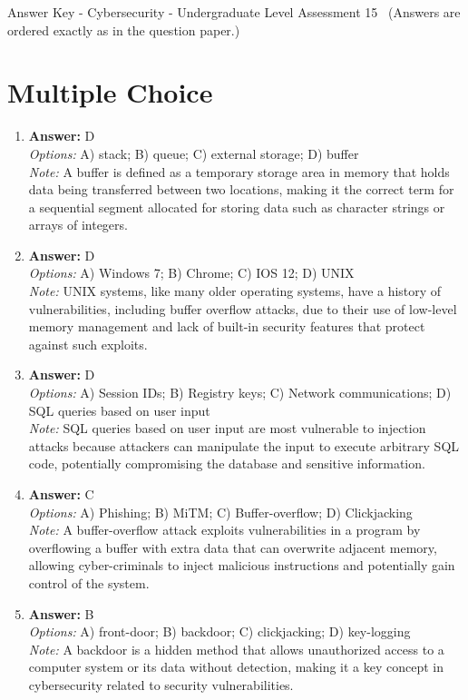 \documentclass[12pt]{article}
\begin{document}
\begin{center}
Answer Key - Cybersecurity - Undergraduate Level Assessment 15 \
\small (Answers are ordered exactly as in the question paper.)
\end{center}

\section*{Multiple Choice}
\begin{enumerate}[label=\arabic*.]
\item \textbf{Answer:} D
\\ \textit{Options:} A) stack; B) queue; C) external storage; D) buffer
\\ \textit{Note:} A buffer is defined as a temporary storage area in memory that holds data being transferred between two locations, making it the correct term for a sequential segment allocated for storing data such as character strings or arrays of integers.
\item \textbf{Answer:} D
\\ \textit{Options:} A) Windows 7; B) Chrome; C) IOS 12; D) UNIX
\\ \textit{Note:} UNIX systems, like many older operating systems, have a history of vulnerabilities, including buffer overflow attacks, due to their use of low-level memory management and lack of built-in security features that protect against such exploits.
\item \textbf{Answer:} D
\\ \textit{Options:} A) Session IDs; B) Registry keys; C) Network communications; D) SQL queries based on user input
\\ \textit{Note:} SQL queries based on user input are most vulnerable to injection attacks because attackers can manipulate the input to execute arbitrary SQL code, potentially compromising the database and sensitive information.
\item \textbf{Answer:} C
\\ \textit{Options:} A) Phishing; B) MiTM; C) Buffer-overflow; D) Clickjacking
\\ \textit{Note:} A buffer-overflow attack exploits vulnerabilities in a program by overflowing a buffer with extra data that can overwrite adjacent memory, allowing cyber-criminals to inject malicious instructions and potentially gain control of the system.
\item \textbf{Answer:} B
\\ \textit{Options:} A) front-door; B) backdoor; C) clickjacking; D) key-logging
\\ \textit{Note:} A backdoor is a hidden method that allows unauthorized access to a computer system or its data without detection, making it a key concept in cybersecurity related to security vulnerabilities.
\end{enumerate}
\end{document}
